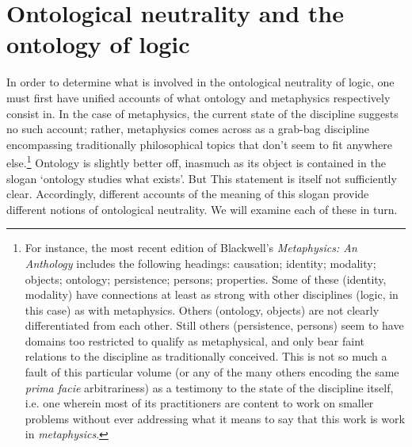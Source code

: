 \documentclass[]{article}
\begin{document}
\section{Ontological neutrality and the ontology of logic}
In order to determine what is involved in the ontological neutrality of logic, one must first have unified accounts of what ontology and metaphysics respectively consist in. In the case of metaphysics, the current state of the discipline suggests no such account; rather, metaphysics comes across as a grab-bag discipline encompassing traditionally philosophical topics that don't seem to fit anywhere else.\footnote{For instance, the most recent edition of Blackwell's \textit{Metaphysics: An Anthology} includes the following headings: causation; identity; modality; objects; ontology; persistence; persons; properties. Some of these (identity, modality) have connections at least as strong with other disciplines (logic, in this case) as with metaphysics. Others (ontology, objects) are not clearly differentiated from each other. Still others (persistence, persons) seem to have domains too restricted to qualify as metaphysical, and only bear faint relations to the discipline as traditionally conceived. This is not so much a fault of this particular volume (or any of the many others encoding the same \textit{prima facie} arbitrariness) as a testimony to the state of the discipline itself, i.e. one wherein most of its practitioners are content to work on smaller problems without ever addressing what it means to say that this work is work in \textit{metaphysics}.} Ontology is slightly better off, inasmuch as its object is contained in the slogan `ontology studies what exists'. But This statement is itself not sufficiently clear. Accordingly, different accounts of the meaning of this slogan provide different notions of ontological neutrality. We will examine each of these in turn.
\end{document}

